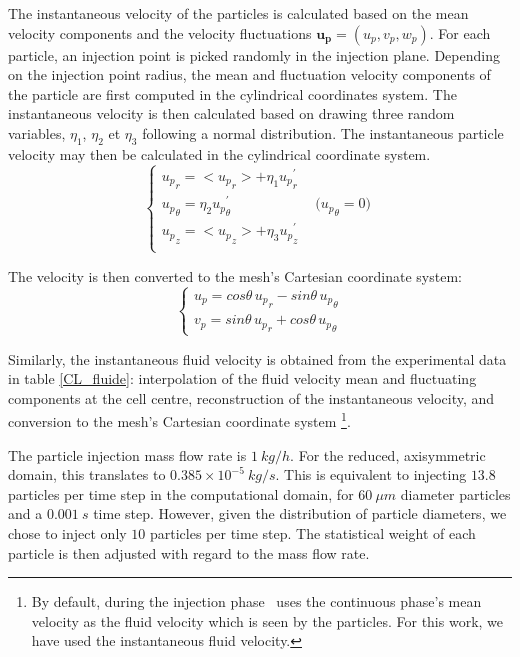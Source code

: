 \begin{itemize}
The instantaneous velocity of the particles is calculated based on the mean velocity components and the velocity fluctuations $\mathbf{u_p}=(u_p,v_p,w_p)$. For each particle, an injection point is picked randomly in the injection plane. Depending on the injection point radius, the mean and fluctuation velocity components of the particle are first computed in the cylindrical coordinates system. The instantaneous velocity is then calculated based on drawing three random variables, $\eta_1$, $\eta_2$ et $\eta_3$ following a normal distribution. The instantaneous particle velocity may then be calculated in the cylindrical coordinate system.
\begin{equation}
   \left\{\begin{array}{l}
      {u_p}_r=<{u_p}_r>+\eta_1 {u_p}_r^\prime \\
      {u_p}_\theta=\eta_2{u_p}_{\theta}^\prime\qquad\qquad\qquad
      \text{(${u_p}_\theta=0$)}               \\
      {u_p}_z=<{u_p}_z>+\eta_3{u_p}_z^\prime  \\
   \end{array}\right.
\end{equation}

The velocity is then converted to the mesh's Cartesian coordinate system:
\begin{equation}
   \left\{\begin{array}{l}
      u_p=cos\theta\, {u_p}_r- sin\theta\, {u_p}_\theta \\
      v_p=sin\theta\, {u_p}_r+ cos\theta\, {u_p}_\theta
   \end{array}\right.
\end{equation}

Similarly, the instantaneous fluid velocity is obtained from the experimental data in table \ref{CL_fluide}: interpolation of the fluid velocity mean and fluctuating components at the cell centre, reconstruction of the instantaneous velocity, and conversion to the mesh's Cartesian coordinate system \footnote{By default, during the injection phase \CS\ uses the continuous phase's mean velocity as the fluid velocity which is seen by the particles. For this work, we have used the instantaneous fluid velocity.}.

\noindent
The particle injection mass flow rate is $1~kg/h$. For the reduced, axisymmetric domain, this translates to $0.385 \times 10^{-5}~kg/s$. This is equivalent to injecting $13.8$ particles per time step in the computational domain, for $60~\mu m$ diameter particles and a $0.001~s$ time step. However, given the distribution of particle diameters, we chose to inject only $10$ particles per time step. The statistical weight of each particle is then adjusted with regard to the mass flow rate.\\


\end{itemize}
